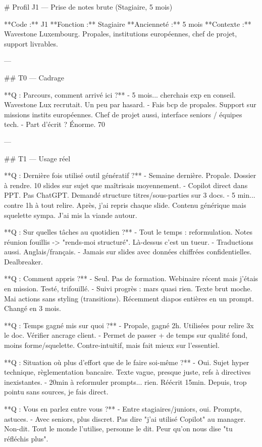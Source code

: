 # Profil J1 — Prise de notes brute (Stagiaire, 5 mois)

**Code :** J1  
**Fonction :** Stagiaire  
**Ancienneté :** 5 mois  
**Contexte :** Wavestone Luxembourg. Propales, institutions européennes, chef de projet, support livrables.

---

## T0 — Cadrage

**Q : Parcours, comment arrivé ici ?**
- 5 mois... cherchais exp en conseil. Wavestone Lux recrutait. Un peu par hasard.
- Fais bcp de propales. Support sur missions instits européennes. Chef de projet aussi, interface seniors / équipes tech.
- Part d'écrit ? Énorme. 70%

---

## T1 — Usage réel

**Q : Dernière fois utilisé outil génératif ?**
- Semaine dernière. Propale. Dossier à rendre. 10 slides sur sujet que maîtrisais moyennement.
- Copilot direct dans PPT. Pas ChatGPT. Demandé structure titres/sous-parties sur 3 docs.
- 5 min... contre 1h à tout relire. Après, j'ai repris chaque slide. Contenu générique mais squelette sympa. J'ai mis la viande autour.

**Q : Sur quelles tâches au quotidien ?**
- Tout le temps : reformulation. Notes réunion fouillis -> "rends-moi structuré". Là-dessus c'est un tueur.
- Traductions aussi. Anglais/français.
- Jamais sur slides avec données chiffrées confidentielles. Dealbreaker.

**Q : Comment appris ?**
- Seul. Pas de formation. Webinaire récent mais j'étais en mission. Testé, trifouillé.
- Suivi progrès : mars quasi rien. Texte brut moche. Mai actions sans styling (transitions). Récemment diapos entières en un prompt. Changé en 3 mois.

**Q : Temps gagné mis sur quoi ?**
- Propale, gagné 2h. Utilisées pour relire 3x le doc. Vérifier ancrage client.
- Permet de passer + de temps sur qualité fond, moins forme/squelette. Contre-intuitif, mais fait mieux sur l'essentiel.

**Q : Situation où plus d'effort que de le faire soi-même ?**
- Oui. Sujet hyper technique, règlementation bancaire. Texte vague, presque juste, refs à directives inexistantes.
- 20min à reformuler prompts... rien. Réécrit 15min. Depuis, trop pointu sans sources, je fais direct.

**Q : Vous en parlez entre vous ?**
- Entre stagiaires/juniors, oui. Prompts, astuces.
- Avec seniors, plus discret. Pas dire "j'ai utilisé Copilot" au manager. Non-dit. Tout le monde l'utilise, personne le dit. Peur qu'on nous dise "tu réfléchis plus".

